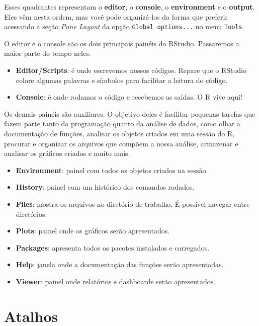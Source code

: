 \documentclass[
]{book}
\providecommand{\tightlist}{%
  \setlength{\itemsep}{0pt}\setlength{\parskip}{0pt}}
\begin{document}
Esses quadrantes representam o \textbf{editor}, o \textbf{console}, o \textbf{environment} e o \textbf{output}. Eles vêm nesta ordem, mas você pode organizá-los da forma que preferir acessando a seção \emph{Pane Layout} da opção \texttt{Global\ options...} no menu \texttt{Tools}.

O editor e o console são os dois principais painéis do RStudio. Passaremos a maior parte do tempo neles.

\begin{itemize}
\tightlist
\item
  \textbf{Editor/Scripts}: é onde escrevemos nossos códigos. Repare que o RStudio colore algumas palavras e símbolos para facilitar a leitura do código.
\item
  \textbf{Console}: é onde rodamos o código e recebemos as saídas. O R vive aqui!
\end{itemize}

Os demais painéis são auxiliares. O objetivo deles é facilitar pequenas tarefas que fazem parte tanto da programação quanto da análise de dados, como olhar a documentação de funções, analisar os objetos criados em uma sessão do R, procurar e organizar os arquivos que compõem a nossa análise, armazenar e analisar os gráficos criados e muito mais.

\begin{itemize}
\tightlist
\item
  \textbf{Environment}: painel com todos os objetos criados na sessão.
\item
  \textbf{History}: painel com um histórico dos comandos rodados.
\item
  \textbf{Files}: mostra os arquivos no diretório de trabalho. É possível navegar entre diretórios.
\item
  \textbf{Plots}: painel onde os gráficos serão apresentados.
\item
  \textbf{Packages}: apresenta todos os pacotes instalados e carregados.
\item
  \textbf{Help}: janela onde a documentação das funções serão apresentadas.
\item
  \textbf{Viewer}: painel onde relatórios e dashboards serão apresentados.
\end{itemize}

\hypertarget{atalhos}{%
\section{Atalhos}\label{atalhos}}
\end{document}
